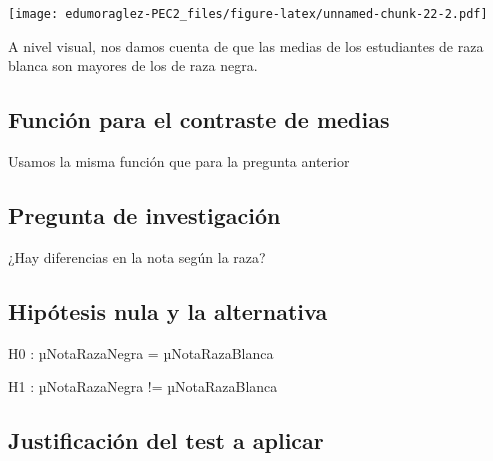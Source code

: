 \documentclass[
]{article}
\newenvironment{Shaded}{\begin{snugshade}}{\end{snugshade}}
\newcommand{\AttributeTok}[1]{\textcolor[rgb]{0.80,0.80,0.80}{#1}}
\newcommand{\CommentTok}[1]{\textcolor[rgb]{0.50,0.62,0.50}{#1}}
\newcommand{\ConstantTok}[1]{\textcolor[rgb]{0.86,0.64,0.64}{\textbf{#1}}}
\newcommand{\FunctionTok}[1]{\textcolor[rgb]{0.94,0.94,0.56}{#1}}
\newcommand{\NormalTok}[1]{\textcolor[rgb]{0.80,0.80,0.80}{#1}}
\newcommand{\OtherTok}[1]{\textcolor[rgb]{0.94,0.94,0.56}{#1}}
\newcommand{\SpecialCharTok}[1]{\textcolor[rgb]{0.86,0.64,0.64}{#1}}
\newcommand{\StringTok}[1]{\textcolor[rgb]{0.80,0.58,0.58}{#1}}
\begin{document}
\begin{Shaded}
\end{Shaded}

\texttt{[image: edumoraglez-PEC2\_files/figure-latex/unnamed-chunk-22-2.pdf]}

A nivel visual, nos damos cuenta de que las medias de los estudiantes de
raza blanca son mayores de los de raza negra.

\hypertarget{funciuxf3n-para-el-contraste-de-medias-2}{%
\subsection{Función para el contraste de
medias}\label{funciuxf3n-para-el-contraste-de-medias-2}}

Usamos la misma función que para la pregunta anterior

\hypertarget{pregunta-de-investigaciuxf3n-2}{%
\subsection{Pregunta de
investigación}\label{pregunta-de-investigaciuxf3n-2}}

¿Hay diferencias en la nota según la raza?

\hypertarget{hipuxf3tesis-nula-y-la-alternativa-2}{%
\subsection{Hipótesis nula y la
alternativa}\label{hipuxf3tesis-nula-y-la-alternativa-2}}

H0 : µNotaRazaNegra = µNotaRazaBlanca

H1 : µNotaRazaNegra != µNotaRazaBlanca

\hypertarget{justificaciuxf3n-del-test-a-aplicar-1}{%
\subsection{Justificación del test a
aplicar}\label{justificaciuxf3n-del-test-a-aplicar-1}}

\begin{Shaded}
\end{Shaded}
\end{document}
